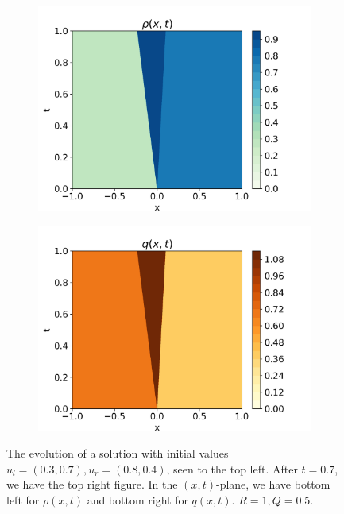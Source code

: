 \documentclass[10pt]{article}
\numberwithin{equation}{section}
\begin{document}
\begin{figure}
\begin{subfigure}[b]{0.35\textwidth}
         \includegraphics[width=\textwidth]{Figures/Model/SysShockRho.png}
     \end{subfigure}
     \begin{subfigure}[b]{0.35\textwidth}
         \centering
         \includegraphics[width=\textwidth]{Figures/Model/SysShockQ.png}
     \end{subfigure}
        \caption{The evolution of a solution with initial values $u_l = (0.3, 0.7), u_r = (0.8, 0.4)$, seen to the top left. After $t = 0.7$, we have the top right figure. In the $(x,t)$-plane, we have bottom left for $\rho(x,t)$ and bottom right for $q(x,t)$. $R = 1, Q = 0.5$.}
        \label{fig:ExampleSysShock}
\end{figure}
\end{document}
